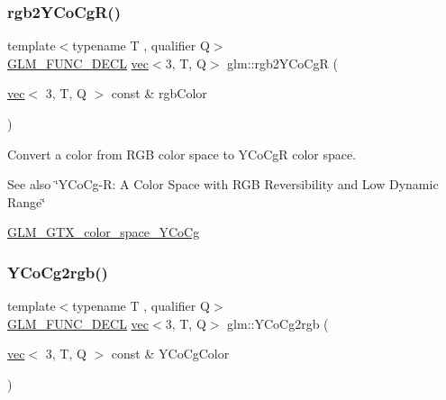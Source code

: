 \subsubsection{\texorpdfstring{rgb2\+Y\+Co\+Cg\+R()}{rgb2YCoCgR()}}
{\footnotesize\ttfamily template$<$typename T , qualifier Q$>$ \\
\mbox{\hyperlink{setup_8hpp_ab2d052de21a70539923e9bcbf6e83a51}{G\+L\+M\+\_\+\+F\+U\+N\+C\+\_\+\+D\+E\+CL}} \mbox{\hyperlink{structglm_1_1vec}{vec}}$<$3, T, Q$>$ glm\+::rgb2\+Y\+Co\+CgR (\begin{DoxyParamCaption}\item[{\mbox{\hyperlink{structglm_1_1vec}{vec}}$<$ 3, T, Q $>$ const \&}]{rgb\+Color }\end{DoxyParamCaption})}

Convert a color from R\+GB color space to Y\+Co\+CgR color space. \begin{DoxySeeAlso}{See also}
\char`\"{}\+Y\+Co\+Cg-\/\+R\+: A Color Space with R\+G\+B Reversibility and Low Dynamic Range\char`\"{} 

\mbox{\hyperlink{group__gtx__color__space___y_co_cg}{G\+L\+M\+\_\+\+G\+T\+X\+\_\+color\+\_\+space\+\_\+\+Y\+Co\+Cg}} 
\end{DoxySeeAlso}
\mbox{\label{group__gtx__color__space___y_co_cg_ga163596b804c7241810b2534a99eb1343}} 
\subsubsection{\texorpdfstring{Y\+Co\+Cg2rgb()}{YCoCg2rgb()}}
{\footnotesize\ttfamily template$<$typename T , qualifier Q$>$ \\
\mbox{\hyperlink{setup_8hpp_ab2d052de21a70539923e9bcbf6e83a51}{G\+L\+M\+\_\+\+F\+U\+N\+C\+\_\+\+D\+E\+CL}} \mbox{\hyperlink{structglm_1_1vec}{vec}}$<$3, T, Q$>$ glm\+::\+Y\+Co\+Cg2rgb (\begin{DoxyParamCaption}\item[{\mbox{\hyperlink{structglm_1_1vec}{vec}}$<$ 3, T, Q $>$ const \&}]{Y\+Co\+Cg\+Color }\end{DoxyParamCaption})}

